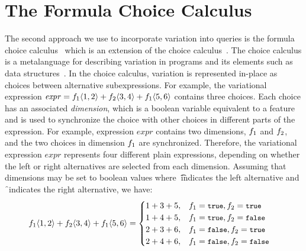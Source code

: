 \section{The Formula Choice Calculus}
\label{sec:fcc}



The second approach we use to incorporate variation into queries is
the formula choice calculus~\cite{HW16fosd} which is an extension of 
the choice calculus~\cite{Walk13thesis,EW11tosem}. 
%
The choice calculus is a metalanguage for
describing variation in programs and its elements such as data 
structures~\cite{Walk14onward,EWC13fosd}.
In the choice calculus, variation is represented in-place as
choices between alternative subexpressions. For example, 
the variational expression 
$\mathit{expr} = \chc [\A] {1,2} + \chc [\B] {3,4} + \chc [\A] {5,6}$
 contains three choices.
Each choice has an associated \emph{dimension}, which is a boolean
variable equivalent to a feature and is used to
synchronize the choice with other choices in different parts
of the expression. For example, expression $\mathit{expr}$ contains
two dimensions, $\A$ and $\B$, and the two choices in dimension
$\A$ are synchronized. Therefore, the variational expression
$\mathit{expr}$ represents four different plain expressions, depending
on whether the left or right alternatives are selected from each
dimension. Assuming that dimensions may be set to boolean values
where \t\ indicates the left alternative and \f\ indicates the
right alternative, we have: 
\begin{alignat*}{1}
\chc [\A] {1,2} + \chc [\B] {3,4} + \chc [\A] {5,6} &=
\begin{cases}
  1+3+5,& \A =\t, \B = \t\\
  1+4+5,& \A =\t, \B = \f\\
  2+3+6,& \A =\f, \B = \t\\
  2+4+6,& \A =\f, \B = \f
\end{cases}
\end{alignat*}
